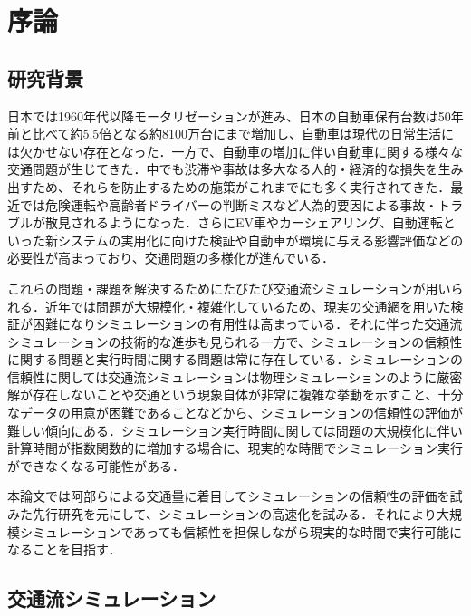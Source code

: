 \chapter{序論}

\section{研究背景}
日本では1960年代以降モータリゼーションが進み、日本の自動車保有台数は50年前と比べて約5.5倍となる約8100万台にまで増加し、自動車は現代の日常生活には欠かせない存在となった．一方で、自動車の増加に伴い自動車に関する様々な交通問題が生じてきた．中でも渋滞や事故は多大なる人的・経済的な損失を生み出すため、それらを防止するための施策がこれまでにも多く実行されてきた．最近では危険運転や高齢者ドライバーの判断ミスなど人為的要因による事故・トラブルが散見されるようになった．さらにEV車やカーシェアリング、自動運転といった新システムの実用化に向けた検証や自動車が環境に与える影響評価などの必要性が高まっており、交通問題の多様化が進んでいる．

これらの問題・課題を解決するためにたびたび交通流シミュレーションが用いられる．近年では問題が大規模化・複雑化しているため、現実の交通網を用いた検証が困難になりシミュレーションの有用性は高まっている．それに伴った交通流シミュレーションの技術的な進歩も見られる一方で、シミュレーションの信頼性に関する問題と実行時間に関する問題は常に存在している．シミュレーションの信頼性に関しては交通流シミュレーションは物理シミュレーションのように厳密解が存在しないことや交通という現象自体が非常に複雑な挙動を示すこと、十分なデータの用意が困難であることなどから、シミュレーションの信頼性の評価が難しい傾向にある．シミュレーション実行時間に関しては問題の大規模化に伴い計算時間が指数関数的に増加する場合に、現実的な時間でシミュレーション実行ができなくなる可能性がある．

本論文では阿部らによる交通量に着目してシミュレーションの信頼性の評価を試みた先行研究を元にして、シミュレーションの高速化を試みる．それにより大規模シミュレーションであっても信頼性を担保しながら現実的な時間で実行可能になることを目指す．

\section{交通流シミュレーション}

